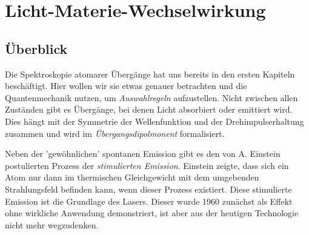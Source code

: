 \renewcommand{\lastmod}{29. November 2024}
\renewcommand{\chapterauthors}{Markus Lippitz}

\chapter{Licht-Materie-Wechselwirkung}






\section{Überblick}
Die Spektroskopie atomarer Übergänge hat uns bereits in den ersten Kapiteln beschäftigt. Hier wollen wir sie etwas genauer betrachten und die Quantenmechanik nutzen, um \emph{Auswahlregeln} aufzustellen. Nicht zwischen allen Zuständen gibt es Übergänge, bei denen Licht absorbiert oder emittiert wird. Dies hängt mit der Symmetrie der Wellenfunktion und der Drehimpulserhaltung zusammen und wird im \emph{Übergangsdipolmonent} formalisiert.



Neben der 'gewöhnlichen' spontanen Emission gibt es den von A. Einstein postulierten Prozess der \emph{stimulierten Emission}. Einstein zeigte, dass sich ein Atom nur dann im thermischen Gleichgewicht mit dem umgebenden Strahlungsfeld befinden kann, wenn dieser Prozess existiert. Diese stimulierte Emission ist die Grundlage des Lasers. Dieser wurde 1960 zunächst als Effekt ohne wirkliche Anwendung demonstriert, ist aber aus der heutigen Technologie nicht mehr wegzudenken.

